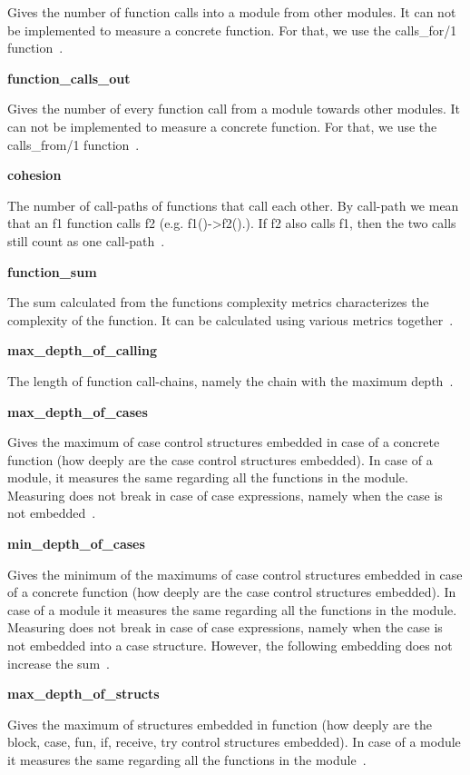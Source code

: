 Gives the number of function calls into a module from other modules. It can not be implemented to measure a concrete function. For that, we use the calls\_for/1 function~\cite{refactorerlm}.

\textbf{function\_calls\_out}

Gives the number of every function call from a module towards other modules. It can not be implemented to measure a concrete function. For that, we use the calls\_from/1 function~\cite{refactorerlm}.

\textbf{cohesion}

The number of call-paths of functions that call each other. By call-path we mean that an f1 function calls f2 (e.g. f1()->f2().). If f2 also calls f1, then the two calls still count as one call-path~\cite{refactorerlm}.

\textbf{function\_sum}

The sum calculated from the functions complexity metrics characterizes the complexity of the function. It can be calculated using various metrics together~\cite{refactorerlm}.
	 
\textbf{max\_depth\_of\_calling}

The length of function call-chains, namely the chain with the maximum depth~\cite{refactorerlm}.
	 
\textbf{max\_depth\_of\_cases}

 Gives the maximum of case control structures embedded in case of a concrete function (how deeply are the case control structures embedded). In case of a module, it measures the same regarding all the functions in the module. Measuring does not break in case of case expressions, namely when the case is not embedded~\cite{refactorerlm}.

\textbf{min\_depth\_of\_cases}

 Gives the minimum of the maximums of case control structures embedded in case of a concrete function (how deeply are the case control structures embedded). In case of a module it measures the same regarding all the functions in the module. Measuring does not break in case of case expressions, namely when the case is not embedded into a case structure. However, the following embedding does not increase the sum~\cite{refactorerlm}.

\textbf{max\_depth\_of\_structs}

 Gives the maximum of structures embedded in function (how deeply are the block, case, fun, if, receive, try control structures embedded). In case of a module it measures the same regarding all the functions in the module~\cite{refactorerlm}.

